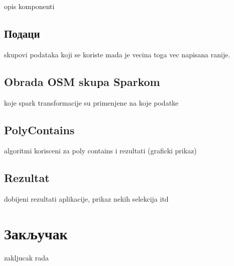\documentclass[12pt,oneside]{memoir}
\begin{document}
opis komponenti

\section{Подаци}
\label{sec:osm_spark_podaci}

skupovi podataka koji se koriste mada je vecina toga vec napisana ranije.

\section{Obrada OSM skupa Sparkom}
\label{sec:osm_spark_obrada}

koje spark transformacije su primenjene na koje podatke

\section{PolyContains}
\label{sec:poly_cont}

algoritmi korisceni za poly contains i rezultati (graficki prikaz)

\section{Rezultat}
\label{sec:rezultat}

dobijeni rezultati aplikacije, prikaz nekih selekcija itd

\chapter{Закључак}
\label{chp:zakljucak}

zakljucak rada

\literatura

\backmatter
\end{document}
